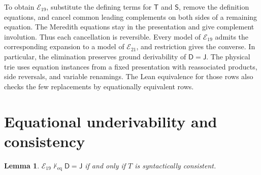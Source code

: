 \documentclass[11pt,letterpaper]{article}
\newtheorem{lemma}[theorem]{Lemma}
\newcommand{\D}{\mathsf D}
\newcommand{\J}{\mathsf J}
\newcommand{\T}{\mathsf T}
\newcommand{\Sstage}{\mathsf S}
\begin{document}
To obtain $\mathcal E_{19}$, substitute the defining terms for $\T$
and $\Sstage$, remove the definition equations, and cancel common
leading complements on both sides of a remaining equation. The
Meredith equations stay in the presentation and give complement
involution. Thus each cancellation is reversible. Every model of
$\mathcal E_{19}$ admits the corresponding expansion to a model of
$\mathcal E_{21}$, and restriction gives the converse. In particular,
the elimination preserves ground derivability of $\D=\J$. The
physical trie uses equation instances from a fixed presentation with
reassociated products, side reversals, and variable renamings.
The Lean equivalence for those rows also checks the few replacements
by equationally equivalent rows.

\section{Equational underivability and consistency}\label{sec:models}

\begin{lemma}\label{lem:equational}
$\mathcal E_{19}\nvdash_{\mathrm{eq}}\D=\J$ if and only if $T$ is
syntactically consistent.
\end{lemma}
\end{document}
